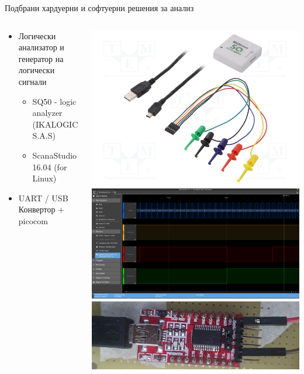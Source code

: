 \documentclass[handout]{beamer}
\begin{document}
\begin{frame}{Подбрани хардуерни и софтуерни решения за анализ}
	\begin{columns}
		\begin{block}{ }
			\begin{itemize}
				\pause
				\item Логически анализатор и генератор на логически сигнали
					\begin{itemize}
						\pause
						\item SQ50 - logic analyzer (IKALOGIC S.A.S)
						\pause
						\item ScanaStudio 16.04 (for Linux)
					\end{itemize}
				\pause
				\item UART / USB Конвертор + picocom
			\end{itemize}
		\end{block}
		\pause
		\includegraphics[width=0.8\linewidth]{Images/SQ50-logic-analyzer.png} \\[0.5em]
		\includegraphics[width=0.8\linewidth]{Images/scana_studio_window.png}\\[0.5em]	
		\includegraphics[width=0.9\linewidth]{Images/uart_usb.png} \\[0.5em]
	\end{columns}
\end{frame}
\end{document}
